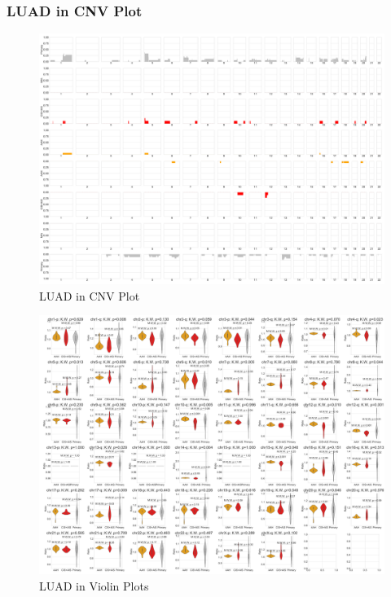 \documentclass{beamer}
\begin{document}
    \begin{frame}[allowframebreaks]
        \frametitle{LUAD in CNV Plot}

        \begin{figure}
            \includegraphics[width=0.6 \linewidth]{figures/Sequenza/BWA-simple-ADC.pdf}
            \caption{LUAD in CNV Plot}
        \end{figure}

        \begin{figure}
            \includegraphics[width=0.8 \linewidth]{figures/Sequenza/BWA-violin-ADC.pdf}
            \caption{LUAD in Violin Plots}
        \end{figure}
    \end{frame}
\end{document}
